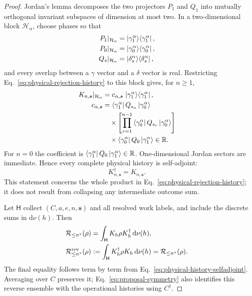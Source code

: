 \documentclass[aps,floatfix,10pt,amssymb,amsmath,superscriptaddress,nofootinbib,longbibliography,nobalancelastpage,twocolumn]{revtex4-2}
\newcommand{\cR}{\mathcal{R}}
\newcommand{\dd}{\mathrm{d}}
\newcommand{\ketbra}[2]{\ket{#1}\!\bra{#2}}
\begin{document}
\begin{proof}
Jordan's lemma decomposes the two projectors $P_1$ and $Q_1$ into
mutually orthogonal invariant subspaces of dimension at most two.  In a
two-dimensional block $\mathcal H_\alpha$, choose phases so that
\begin{align}
 P_1|_{\mathcal H_\alpha}
 &=\ketbra{\gamma_1^\alpha}{\gamma_1^\alpha},
 \nonumber\\
 P_0|_{\mathcal H_\alpha}
 &=\ketbra{\gamma_0^\alpha}{\gamma_0^\alpha},
 \nonumber\\
 Q_s|_{\mathcal H_\alpha}
 &=\ketbra{\delta_s^\alpha}{\delta_s^\alpha},
 \label{eq:jordan-real-projectors}
\end{align}
and every overlap between a $\gamma$ vector and a $\delta$ vector is
real.  Restricting Eq.~\eqref{eq:physical-rejection-history} to this
block gives, for $n\geq1$,
\begin{align}
 K_{n,\bm{s}}|_{\mathcal H_\alpha}
 &=c_{\alpha,\bm{s}}\,
 \ketbra{\gamma_1^\alpha}{\gamma_1^\alpha},
 \label{eq:history-jordan-form}\\
 c_{\alpha,\bm{s}}
 &=\bra{\gamma_1^\alpha}Q_{s_n}
 \ket{\gamma_0^\alpha}\nonumber\\
 &\quad\times
 \left[
 \prod_{r=1}^{n-1}
 \bra{\gamma_0^\alpha}Q_{s_r}\ket{\gamma_0^\alpha}
 \right]\nonumber\\
 &\quad\times
 \bra{\gamma_0^\alpha}Q_0\ket{\gamma_1^\alpha}
 \in\mathbb R.
 \label{eq:history-real-coefficient}
\end{align}
For $n=0$ the coefficient is
$\bra{\gamma_1^\alpha}Q_0\ket{\gamma_1^\alpha}\in\mathbb R$.
One-dimensional Jordan sectors are immediate.  Hence every complete
physical history is self-adjoint:
\begin{equation}
 K_{n,\bm{s}}^\dagger=K_{n,\bm{s}}.
 \label{eq:physical-history-selfadjoint}
\end{equation}
This statement concerns the whole product in
Eq.~\eqref{eq:physical-rejection-history}; it does not result from
collapsing any intermediate outcome sum.

Let $\mathsf H$ collect $(C,a,e,n,\bm{s})$ and all resolved work labels,
and include the discrete sums in $\dd\nu(h)$.  Then
\begin{align}
 \cR_{\leq n^*}(\rho)
 &=\int_{\mathsf H}K_h\rho K_h^\dagger\,\dd\nu(h),
 \label{eq:physical-R-kraus}\\
 \cR_{\leq n^*}^{\rm rev}(\rho)
 &:=\int_{\mathsf H}K_h^\dagger\rho K_h\,\dd\nu(h)
 =\cR_{\leq n^*}(\rho).
 \label{eq:physical-R-reversal}
\end{align}
The final equality follows term by term from
Eq.~\eqref{eq:physical-history-selfadjoint}.  Averaging over $C$
preserves it; Eq.~\eqref{eq:proposal-symmetry} also identifies this
reverse ensemble with the operational histories using $C^\dagger$.


\end{proof}
\end{document}
